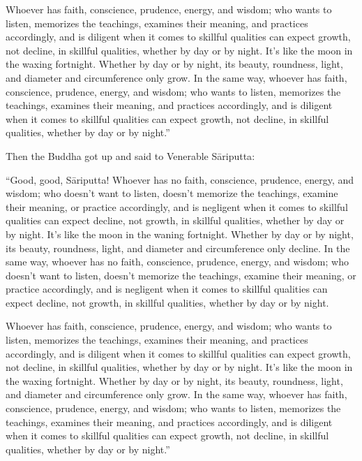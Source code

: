 \documentclass[12pt,openany]{book}%
\begin{document}
Whoever has faith, conscience, prudence, energy, and wisdom; who wants to listen, memorizes the teachings, examines their meaning, and practices accordingly, and is diligent when it comes to skillful qualities can expect growth, not decline, in skillful qualities, whether by day or by night. It’s like the moon in the waxing fortnight. Whether by day or by night, its beauty, roundness, light, and diameter and circumference only grow. In the same way, whoever has faith, conscience, prudence, energy, and wisdom; who wants to listen, memorizes the teachings, examines their meaning, and practices accordingly, and is diligent when it comes to skillful qualities can expect growth, not decline, in skillful qualities, whether by day or by night.” 

Then the Buddha got up and said to Venerable \textsanskrit{Sāriputta}: 

“Good, good, \textsanskrit{Sāriputta}! Whoever has no faith, conscience, prudence, energy, and wisdom; who doesn’t want to listen, doesn’t memorize the teachings, examine their meaning, or practice accordingly, and is negligent when it comes to skillful qualities can expect decline, not growth, in skillful qualities, whether by day or by night. It’s like the moon in the waning fortnight. Whether by day or by night, its beauty, roundness, light, and diameter and circumference only decline. In the same way, whoever has no faith, conscience, prudence, energy, and wisdom; who doesn’t want to listen, doesn’t memorize the teachings, examine their meaning, or practice accordingly, and is negligent when it comes to skillful qualities can expect decline, not growth, in skillful qualities, whether by day or by night. 

Whoever has faith, conscience, prudence, energy, and wisdom; who wants to listen, memorizes the teachings, examines their meaning, and practices accordingly, and is diligent when it comes to skillful qualities can expect growth, not decline, in skillful qualities, whether by day or by night. It’s like the moon in the waxing fortnight. Whether by day or by night, its beauty, roundness, light, and diameter and circumference only grow. In the same way, whoever has faith, conscience, prudence, energy, and wisdom; who wants to listen, memorizes the teachings, examines their meaning, and practices accordingly, and is diligent when it comes to skillful qualities can expect growth, not decline, in skillful qualities, whether by day or by night.” 
\end{document}
